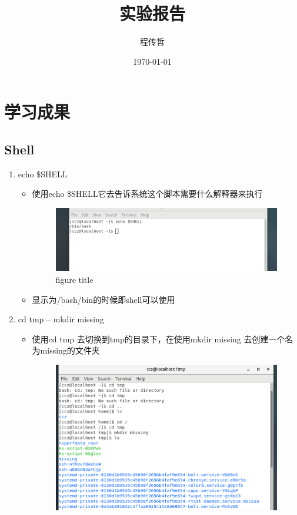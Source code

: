 \documentclass[a4paper, 12pt]{article}
\begin{document}
    {\huge\title{实验报告}}
    {\large\author{程传哲}}
    \date{\today}
    \maketitle
\section{学习成果}

\subsection{Shell}
\begin{enumerate}
  \item {\large echo \$SHELL} 
    \begin{itemize}
      \item 使用echo \$SHELL它去告诉系统这个脚本需要什么解释器来执行
      \begin{figure}[htbp]
        \centering
        \includegraphics[scale=0.5]{1.png}
        \caption{figure title}
        \label{figure}
      \end{figure}
      \item 显示为/bash/bin的时候即shell可以使用
    \end{itemize}
  \item {\large cd tmp -- mkdir missing}
    \begin{itemize}
      \item 使用cd tmp 去切换到tmp的目录下，在使用mkdir missing 去创建一个名为missing的文件夹
      \begin{figure}[htbp]
        \centering
        \includegraphics[scale=0.5]{2.png}

\end{figure}
\end{itemize}
\end{enumerate}
\end{document}
